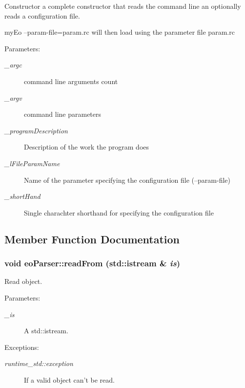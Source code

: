 Constructor a complete constructor that reads the command line an optionally reads a configuration file. 

my\-Eo --param-file=param.rc will then load using the parameter file param.rc

\begin{Desc}
\item[Parameters:]
\begin{description}
\item[{\em \_\-argc}]command line arguments count \item[{\em \_\-argv}]command line parameters \item[{\em \_\-program\-Description}]Description of the work the program does \item[{\em \_\-l\-File\-Param\-Name}]Name of the parameter specifying the configuration file (--param-file) \item[{\em \_\-short\-Hand}]Single charachter shorthand for specifying the configuration file \end{description}
\end{Desc}


\subsection{Member Function Documentation}
\subsubsection{\setlength{\rightskip}{0pt plus 5cm}void eo\-Parser::read\-From (std::istream \& {\em is})\hspace{0.3cm}{\tt  [virtual]}}\label{classeo_parser_a2}


Read object. 

\begin{Desc}
\item[Parameters:]
\begin{description}
\item[{\em \_\-is}]A std::istream. \end{description}
\end{Desc}
\begin{Desc}
\item[Exceptions:]
\begin{description}
\item[{\em runtime\_\-std::exception}]If a valid object can't be read. \end{description}
\end{Desc}


